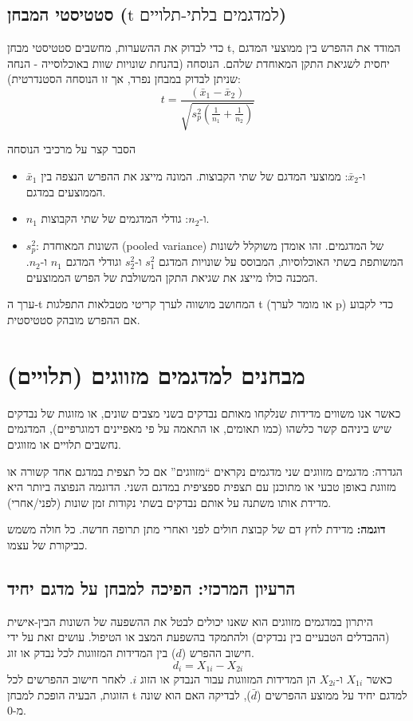 \documentclass[12pt]{article}
\newcommand{\enquote}[1]{\textquotedblleft #1\textquotedblright}
\begin{document}
\subsection*{סטטיסטי המבחן (\(\text{t למדגמים בלתי-תלויים}\))}
כדי לבדוק את ההשערות, מחשבים סטטיסטי מבחן t, המודד את ההפרש בין ממוצעי המדגם יחסית לשגיאת התקן המאוחדת שלהם. הנוסחה (בהנחת שונויות שוות באוכלוסייה - הנחה שניתן לבדוק במבחן נפרד, אך זו הנוסחה הסטנדרטית):
\[ t = \frac{(\bar{x}_1 - \bar{x}_2)}{\sqrt{s_p^2 \left(\frac{1}{n_1} + \frac{1}{n_2}\right)}} \]

\begin{remarkBox}{הסבר קצר על מרכיבי הנוסחה}
\begin{itemize}
    \item \(\bar{x}_1\) ו-\(\bar{x}_2\): ממוצעי המדגם של שתי הקבוצות. המונה מייצג את ההפרש הנצפה בין הממוצעים במדגם.
    \item \(n_1\) ו-\(n_2\): גודלי המדגמים של שתי הקבוצות.
    \item \(s_p^2\): השונות המאוחדת (pooled variance) של המדגמים. זהו אומדן משוקלל לשונות המשותפת בשתי האוכלוסיות, המבוסס על שונויות המדגם \(s_1^2\) ו-\(s_2^2\) וגודלי המדגם \(n_1\) ו-\(n_2\). המכנה כולו מייצג את שגיאת התקן המשולבת של הפרש הממוצעים.
\end{itemize}
ערך ה-t המחושב מושווה לערך קריטי מטבלאות התפלגות t (או מומר לערך p) כדי לקבוע אם ההפרש מובהק סטטיסטית.
\end{remarkBox}

\section{מבחנים למדגמים מזווגים (תלויים)}
כאשר אנו משווים מדידות שנלקחו מאותם נבדקים בשני מצבים שונים, או מזוגות של נבדקים שיש ביניהם קשר כלשהו (כמו תאומים, או התאמה על פי מאפיינים דמוגרפיים), המדגמים נחשבים תלויים או מזווגים.

\begin{definitionBox}{הגדרה: מדגמים מזווגים}
שני מדגמים נקראים \enquote{מזווגים} אם כל תצפית במדגם אחד קשורה או מזווגת באופן טבעי או מתוכנן עם תצפית ספציפית במדגם השני. הדוגמה הנפוצה ביותר היא מדידת אותו משתנה על אותם נבדקים בשתי נקודות זמן שונות (לפני/אחרי).

\vspace{0.5\baselineskip} %
\textbf{דוגמה:} מדידת לחץ דם של קבוצת חולים לפני ואחרי מתן תרופה חדשה. כל חולה משמש כביקורת של עצמו.
\end{definitionBox}

\subsection*{הרעיון המרכזי: הפיכה למבחן על מדגם יחיד}
היתרון במדגמים מזווגים הוא שאנו יכולים לבטל את ההשפעה של השונות הבין-אישית (ההבדלים הטבעיים בין נבדקים) ולהתמקד בהשפעת המצב או הטיפול. עושים זאת על ידי חישוב ההפרש (\(d\)) בין המדידות המזווגות לכל נבדק או זוג.
\[ d_i = X_{1i} - X_{2i} \]
כאשר \(X_{1i}\) ו-\(X_{2i}\) הן המדידות המזווגות עבור הנבדק או הזוג \(i\). לאחר חישוב ההפרשים לכל הזוגות, הבעיה הופכת למבחן t למדגם יחיד על ממוצע ההפרשים (\(\bar{d}\)), לבדיקה האם הוא שונה מ-0.
\end{document}
